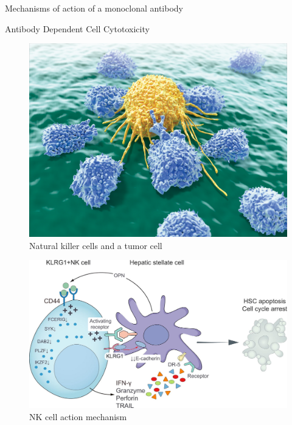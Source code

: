 \begin{frame}{Mechanisms of action of a monoclonal antibody}
    \begin{block}{Antibody Dependent Cell Cytotoxicity}
        \vspace{1em}
        \begin{minipage}{0.35\textwidth}
            \begin{figure}
                \centering
                \includegraphics[width=\textwidth]{../Images/nk_cell_meb.jpg}
                \caption{Natural killer cells and a tumor cell}
            \end{figure}  
        \end{minipage}\hfill
        \begin{minipage}{0.6\textwidth}
            \begin{figure}
                \centering
                \includegraphics[width=\textwidth]{../Images/nk_cell_schematics.jpg}
                \caption{NK cell action mechanism}
            \end{figure}    
        \end{minipage}
    \end{block}
\end{frame}

